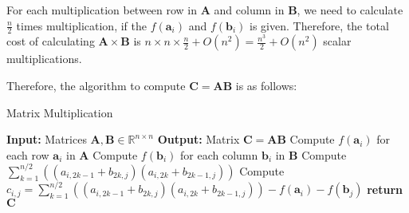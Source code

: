 \documentclass{article}
\newcommand{\R}{\mathbb{R}}
\begin{document}
\noindent
For each multiplication between row in \(\bm{A}\) and column in \(\bm{B}\), we need to calculate \(\frac{n}{2}\) times multiplication, if the \(f(\bm{a}_i)\) and \( f(\bm{b}_i)\) is given. Therefore, the total cost of calculating \(\bm{A} \times \bm{B}\) is \(n \times n \times \frac{n}{2} + O(n^2) = \frac{n^3}{2} + O(n^2)\) scalar multiplications.

\noindent
Therefore, the algorithm to compute \(\bm{C} = \bm{A}\bm{B}\) is as follows:

\noindent
\begin{algorithm}
    \caption{Matrix Multiplication}
    \begin{algorithmic}[1]
        \State \textbf{Input:} Matrices \(\bm{A}, \bm{B} \in \R^{n \times n}\)
        \State \textbf{Output:} Matrix \(\bm{C} = \bm{A} \bm{B}\)
        \State Compute \(f(\bm{a}_i)\) for each row \(\bm{a}_i\) in \(\bm{A}\)
        \State Compute \(f(\bm{b}_i)\) for each column \(\bm{b}_i\) in \(\bm{B}\)
                \State Compute \(\sum_{k = 1}^{n / 2}((a_{i, 2k - 1} + b_{2k, j})(a_{i, 2k} + b_{2k - 1, j}))\)
                \State Compute \(c_{i, j} = \sum_{k = 1}^{n / 2}((a_{i, 2k - 1} + b_{2k, j})(a_{i, 2k} + b_{2k - 1, j})) - f(\bm{a}_i) - f(\bm{b}_j)\)
            \EndFor
        \EndFor
        \State \textbf{return} \(\bm{C}\)
    \end{algorithmic}
\end{algorithm}
\end{document}
